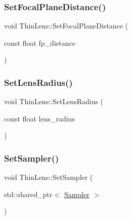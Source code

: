 \subsubsection{\texorpdfstring{Set\+Focal\+Plane\+Distance()}{SetFocalPlaneDistance()}}
{\footnotesize\ttfamily void Thin\+Lens\+::\+Set\+Focal\+Plane\+Distance (\begin{DoxyParamCaption}\item[{const float}]{fp\+\_\+distance }\end{DoxyParamCaption})\hspace{0.3cm}{\ttfamily [inline]}}

\hypertarget{class_thin_lens_a5d4e3ec359df6ebb4dc5163fa48acfc5}{}\label{class_thin_lens_a5d4e3ec359df6ebb4dc5163fa48acfc5} 
\subsubsection{\texorpdfstring{Set\+Lens\+Radius()}{SetLensRadius()}}
{\footnotesize\ttfamily void Thin\+Lens\+::\+Set\+Lens\+Radius (\begin{DoxyParamCaption}\item[{const float}]{lens\+\_\+radius }\end{DoxyParamCaption})\hspace{0.3cm}{\ttfamily [inline]}}

\hypertarget{class_thin_lens_acf205ce5a21bd65783c2e67c056664c8}{}\label{class_thin_lens_acf205ce5a21bd65783c2e67c056664c8} 
\subsubsection{\texorpdfstring{Set\+Sampler()}{SetSampler()}}
{\footnotesize\ttfamily void Thin\+Lens\+::\+Set\+Sampler (\begin{DoxyParamCaption}\item[{std\+::shared\+\_\+ptr$<$ \hyperlink{class_sampler}{Sampler} $>$}]{ }\end{DoxyParamCaption})}

\hypertarget{class_thin_lens_a5979bace2e20ea3ede301dff105c403e}{}\label{class_thin_lens_a5979bace2e20ea3ede301dff105c403e} 
